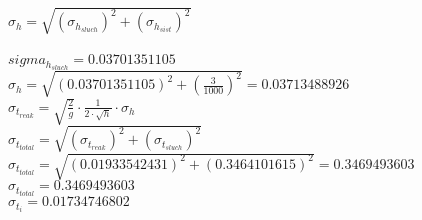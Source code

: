\documentclass[a4paper, 9pt]{article}
\begin{document}
$\sigma_h = \sqrt{(\sigma_{h_{sluch}})^2+(\sigma_{h_{sist}})^2}$\\	\\

$sigma_{h_{sluch}} = 0.03701351105$\\

$\sigma_h = \sqrt{(0.03701351105)^2+(\frac{3}{1000})^2} = 0.03713488926$\\

$\sigma_{t_{reak}} = \sqrt{\frac{2}{g}} \cdot \frac{1}{2\cdot \sqrt{h}} \cdot \sigma_{h}$\\


$\sigma_{t_{total}} = \sqrt{(\sigma_{t_{reak}})^2+(\sigma_{t_{sluch}})^2}$\\

$\sigma_{t_{total}} = \sqrt{(0.01933542431)^2+(0.3464101615)^2} = 0.3469493603$\\

$\sigma_{t_{total}} = 0.3469493603$\\

$\sigma_{t_{i}} = 0.01734746802$






	
	
\end{document}
